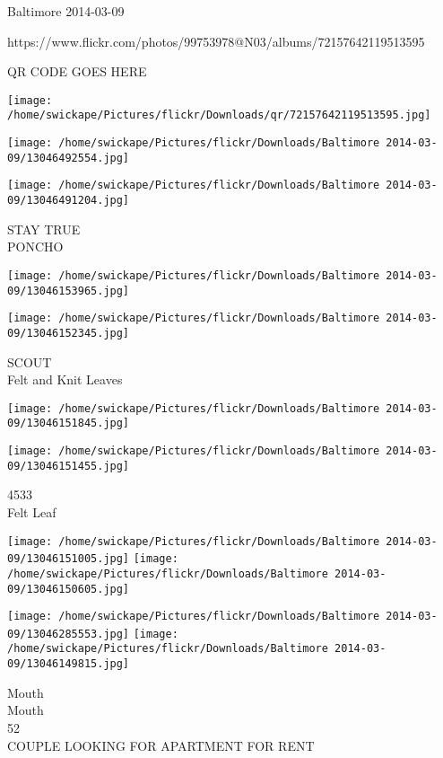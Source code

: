 \documentclass[10pt,letterpaper]{article}
\begin{document}
Baltimore 2014-03-09

https://www.flickr.com/photos/99753978@N03/albums/72157642119513595

QR CODE GOES HERE

\texttt{[image: /home/swickape/Pictures/flickr/Downloads/qr/72157642119513595.jpg]}
\pagebreak

\texttt{[image: /home/swickape/Pictures/flickr/Downloads/Baltimore 2014-03-09/13046492554.jpg]}

\vspace{0.25in}
\texttt{[image: /home/swickape/Pictures/flickr/Downloads/Baltimore 2014-03-09/13046491204.jpg]}

STAY TRUE\\
PONCHO\\
\pagebreak

\texttt{[image: /home/swickape/Pictures/flickr/Downloads/Baltimore 2014-03-09/13046153965.jpg]}

\vspace{0.25in}
\texttt{[image: /home/swickape/Pictures/flickr/Downloads/Baltimore 2014-03-09/13046152345.jpg]}

SCOUT\\
Felt and Knit Leaves\\
\pagebreak

\texttt{[image: /home/swickape/Pictures/flickr/Downloads/Baltimore 2014-03-09/13046151845.jpg]}

\vspace{0.25in}
\texttt{[image: /home/swickape/Pictures/flickr/Downloads/Baltimore 2014-03-09/13046151455.jpg]}

4533\\
Felt Leaf\\
\pagebreak

\texttt{[image: /home/swickape/Pictures/flickr/Downloads/Baltimore 2014-03-09/13046151005.jpg]}
\texttt{[image: /home/swickape/Pictures/flickr/Downloads/Baltimore 2014-03-09/13046150605.jpg]}

\texttt{[image: /home/swickape/Pictures/flickr/Downloads/Baltimore 2014-03-09/13046285553.jpg]}
\texttt{[image: /home/swickape/Pictures/flickr/Downloads/Baltimore 2014-03-09/13046149815.jpg]}

Mouth\\
Mouth\\
52\\
COUPLE LOOKING FOR APARTMENT FOR RENT\\
\pagebreak
\end{document}
